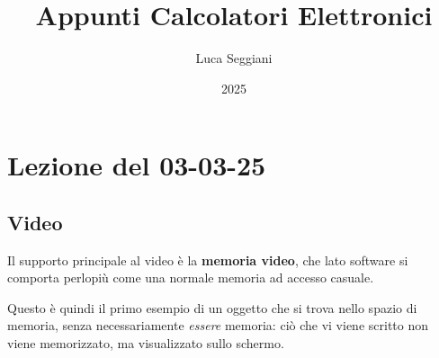 \documentclass[a4paper,11pt]{article}
\title{Appunti Calcolatori Elettronici}
\author{Luca Seggiani}
\date{2025}
\begin{document}
\section{Lezione del 03-03-25}

\thispagestyle{empty}
\pagestyle{fancy}

\subsection{Video}
Il supporto principale al video è la \textbf{memoria video}, che lato software si comporta perlopiù come una normale memoria ad accesso casuale.

Questo è quindi il primo esempio di un oggetto che si trova nello spazio di memoria, senza necessariamente \textit{essere} memoria: ciò che vi viene scritto non viene memorizzato, ma visualizzato sullo schermo.
\end{document}
